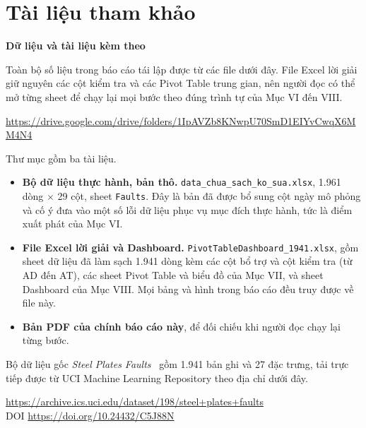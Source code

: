 \documentclass[12pt]{article}
\begin{document}
\clearpage
\section*{Tài liệu tham khảo}

\noindent \textbf{Dữ liệu và tài liệu kèm theo}

\noindent Toàn bộ số liệu trong báo cáo tái lập được từ các file dưới đây. File Excel lời giải giữ nguyên các cột kiểm tra và các Pivot Table trung gian, nên người đọc có thể mở từng sheet để chạy lại mọi bước theo đúng trình tự của Mục VI đến VIII.

\begin{center}
\url{https://drive.google.com/drive/folders/1IpAVZb8KNwpU70SmD1EIYvCwqX6MM4N4}
\end{center}

\noindent Thư mục gồm ba tài liệu.

\begin{itemize}
  \item \textbf{Bộ dữ liệu thực hành, bản thô.} \texttt{data\_chua\_sach\_ko\_sua.xlsx}, 1.961 dòng $\times$ 29 cột, sheet \texttt{Faults}. Đây là bản đã được bổ sung cột ngày mô phỏng và cố ý đưa vào một số lỗi dữ liệu phục vụ mục đích thực hành, tức là điểm xuất phát của Mục VI.
  \item \textbf{File Excel lời giải và Dashboard.} \texttt{PivotTableDashboard\_1941.xlsx}, gồm sheet dữ liệu đã làm sạch 1.941 dòng kèm các cột bổ trợ và cột kiểm tra (từ AD đến AT), các sheet Pivot Table và biểu đồ của Mục VII, và sheet Dashboard của Mục VIII. Mọi bảng và hình trong báo cáo đều truy được về file này.
  \item \textbf{Bản PDF của chính báo cáo này}, để đối chiếu khi người đọc chạy lại từng bước.
\end{itemize}

\noindent Bộ dữ liệu gốc \emph{Steel Plates Faults}~\cite{steelplates2010} gồm 1.941 bản ghi và 27 đặc trưng, tải trực tiếp được từ UCI Machine Learning Repository theo địa chỉ dưới đây.

\begin{center}
\url{https://archive.ics.uci.edu/dataset/198/steel+plates+faults}\\[2pt]
DOI \url{https://doi.org/10.24432/C5J88N}
\end{center}
\end{document}
